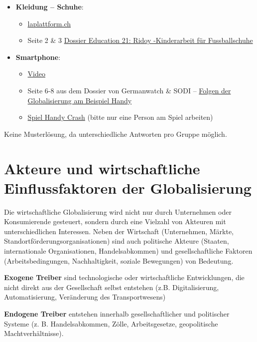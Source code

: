 \begin{myexercise}
\begin{textBox}[title=Hintergrund-Informationen und Recherche-Materialien]
\begin{itemize}
	\item \textbf{Kleidung -- Schuhe}:
	\begin{itemize}
	\item \href{https://laplattform.ch/?record=schweiz-7484&src=online&standort=BE&pid=lvhp7e1jmuc2p1luknt0c51r51#b84f6bbd59f68f8390abb8b480a66258}{laplattform.ch}
	\item Seite 2 \& 3 \href{https://education21.ch/sites/default/files/2020-08/5.06.07545.de_.pdf}{Dossier Education 21: Ridoy -Kinderarbeit für Fussballschuhe}
	\end{itemize}	
	
	\item \textbf{Smartphone}:
	\begin{itemize}
	\item \href{https://www.youtube.com/watch?v=Pjujd-zWlrE&ab_channel=HermannLietzAlumni%2CFreunde%26.Altb%C3%BCrger}{Video}
	
	\item Seite 6-8 aus dem Dossier von Germanwatch \& SODI – \href{https://www.germanwatch.org/sites/default/files/publication/11036.pdf}{Folgen der Globalisierung am Beispiel Handy}
	\item \href{https://www.handycrash.org/}{Spiel Handy Crash} (bitte nur eine Person am Spiel arbeiten)
	\end{itemize}
\end{itemize}
\end{textBox}
\begin{myanswer}
Keine Musterlösung, da unterschiedliche Antworten pro Gruppe möglich.
\end{myanswer}

\end{myexercise}

\chapter{Akteure und wirtschaftliche Einflussfaktoren der Globalisierung}

Die wirtschaftliche Globalisierung wird nicht nur durch Unternehmen oder Konsumierende gesteuert, sondern durch eine Vielzahl von Akteuren mit unterschiedlichen Interessen. Neben der Wirtschaft (Unternehmen, Märkte, Standortförderungsorganisationen) sind auch politische Akteure (Staaten, internationale Organisationen, Handelsabkommen) und gesellschaftliche Faktoren (Arbeitsbedingungen, Nachhaltigkeit, soziale Bewegungen) von Bedeutung.

\begin{mydefinition}
\item \textbf{Exogene Treiber} sind technologische oder wirtschaftliche Entwicklungen, die nicht direkt aus der Gesellschaft selbst entstehen (z.B. Digitalisierung, Automatisierung, Veränderung des Transportwesens)
\item \textbf{Endogene Treiber} entstehen innerhalb gesellschaftlicher und politischer Systeme (z. B. Handelsabkommen, Zölle, Arbeitsgesetze, geopolitische Machtverhältnisse).
\end{mydefinition}



